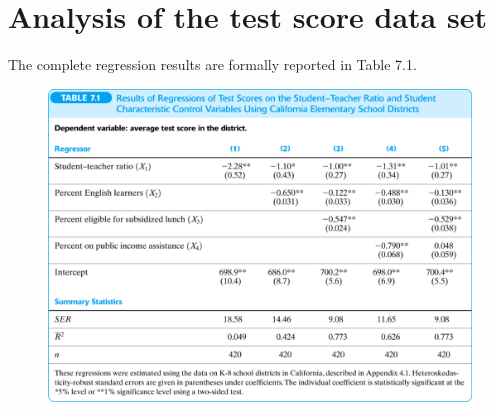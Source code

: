 \documentclass[a4paper,11pt]{article}
\begin{document}
\section{Analysis of the test score data set}
\label{sec:org8f2fa5c}
The complete regression results are formally reported in Table 7.1.

\begin{figure}[!ht]
\centering
\includegraphics[width=1.0\textwidth]{img/tab-7-1.png}
\end{figure}
\end{document}
